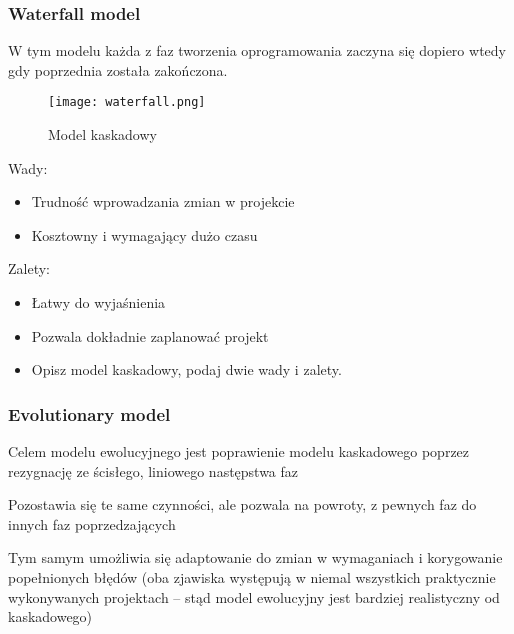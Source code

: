 \documentclass[a4paper,15pt]{article}
\newcommand{\definition}[2]{
    \begin{tcolorbox}[colback=gray!5!white,colframe=gray,title={Definicja -  #1}]
        #2
    \end{tcolorbox}
}
\begin{document}
\newpage
\subsubsection{Waterfall model}


\definition{Waterfall model}{
W tym modelu każda z faz tworzenia oprogramowania zaczyna się dopiero wtedy gdy poprzednia została zakończona.
\begin{figure}[H]
\centerline{\texttt{[image: waterfall.png]}}
\caption{Model kaskadowy}
\label{fig:ANTIinhibitor}
\end{figure}

}

\begin{tcolorbox}[colback=red!5!white,colframe=red!75!black]
  Wady:
  \begin{itemize}
  	\item Trudność wprowadzania zmian w projekcie
  	\item Kosztowny i wymagający dużo czasu
  \end{itemize}
\end{tcolorbox}

\begin{tcolorbox}[colback=green!5!white,colframe=green!75!black]
  Zalety:
  \begin{itemize}
  	\item Łatwy do wyjaśnienia
  	\item Pozwala dokładnie zaplanować projekt
  \end{itemize}
\end{tcolorbox}


\begin{framed}
\begin{itemize}
\item Opisz model kaskadowy, podaj dwie wady i zalety.
\end{itemize}
\end{framed}




\newpage
\subsubsection{Evolutionary model}


\definition{Evolutionary model}{
Celem modelu ewolucyjnego jest poprawienie modelu kaskadowego poprzez rezygnację ze ścisłego, liniowego następstwa faz

Pozostawia się te same czynności, ale pozwala na powroty, z pewnych faz do innych faz poprzedzających

Tym samym umożliwia się adaptowanie do zmian w wymaganiach i korygowanie popełnionych błędów (oba zjawiska występują w niemal wszystkich praktycznie wykonywanych projektach – stąd model ewolucyjny jest bardziej realistyczny od kaskadowego) 

}
\end{document}
